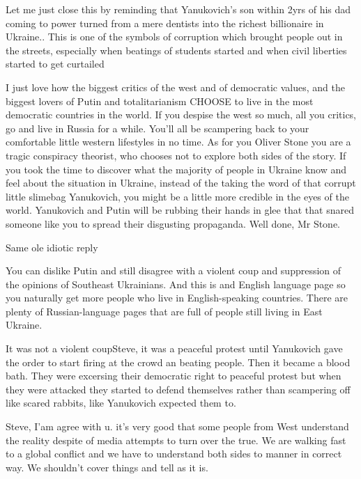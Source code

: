 \begin{itemize}
\begin{itemize}
Let me just close this by reminding that Yanukovich's son within 2yrs of his
dad coming to power turned from a mere dentists into the richest billionaire in
Ukraine.. This is one of the symbols of corruption which brought people out in
the streets, especially when beatings of students started and when civil
liberties started to get curtailed

\end{itemize} %


I just love how the biggest critics of the west and of democratic values, and
the biggest lovers of Putin and totalitarianism CHOOSE to live in the most
democratic countries in the world. If you despise the west so much, all you
critics, go and live in Russia for a while. You'll all be scampering back to
your comfortable little western lifestyles in no time. As for you Oliver Stone
you are a tragic conspiracy theorist, who chooses not to explore both sides of
the story. If you took the time to discover what the majority of people in
Ukraine know and feel about the situation in Ukraine, instead of the taking the
word of that corrupt little slimebag Yanukovich, you might be a little more
credible in the eyes of the world. Yanukovich and Putin will be rubbing their
hands in glee that that snared someone like you to spread their disgusting
propaganda. Well done, Mr Stone.

\begin{itemize} %
Same ole idiotic reply


You can dislike Putin and still disagree with a violent coup and suppression of
the opinions of Southeast Ukrainians. And this is and English language page so
you naturally get more people who live in English-speaking countries. There are
plenty of Russian-language pages that are full of people still living in East
Ukraine.



It was not a violent coupSteve, it was a peaceful protest until Yanukovich gave
the order to start firing at the crowd an beating people. Then it became a
blood bath. They were excersing their democratic right to peaceful protest but
when they were attacked they started to defend themselves rather than
scampering off like scared rabbits, like Yanukovich expected them to.


Steve, I'am agree with u. it's very good that some people from West understand
the reality despite of media attempts to turn over the true. We are walking
fast to a global conflict and we have to understand both sides to manner in
correct way. We shouldn't cover things and tell as it is.


\end{itemize}
\end{itemize}

